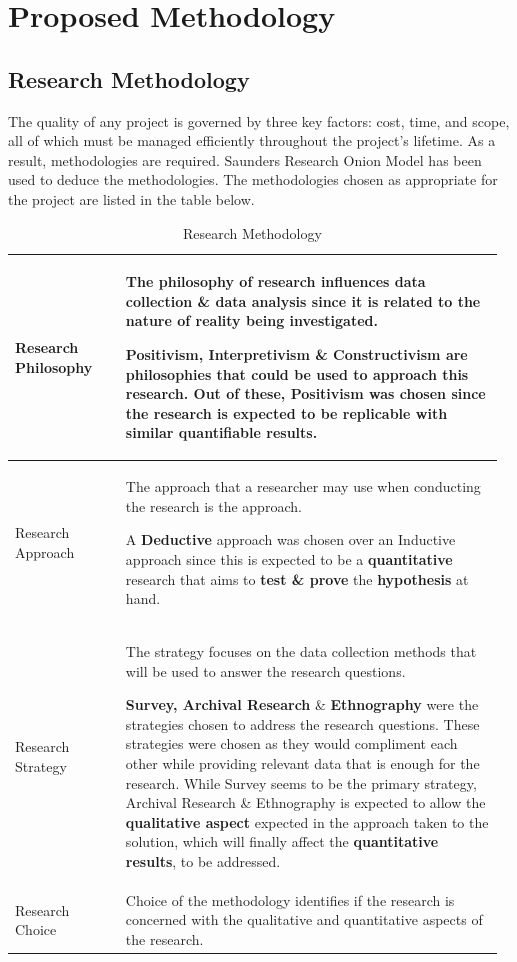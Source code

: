 \documentclass[a4paper, 12pt, oneside]{report}
\begin{document}
\chapter{Proposed Methodology}

\section{Research Methodology}
The quality of any project is governed by three key factors: cost, time, and scope, all of which must be managed efficiently throughout the project's lifetime. As a result, methodologies are required. Saunders  Research Onion Model has been used to deduce the methodologies. 
The methodologies chosen as appropriate for the project are listed in the table below.

\begin{longtable}{| p{0.22\linewidth} | p{0.75\linewidth}|}
\caption{Research Methodology}
\label{tab:research-methodology-table}\\
\hline
Research Philosophy  & The philosophy of research influences data collection \& data analysis since it is related to the nature of reality being investigated.

Positivism, Interpretivism \& Constructivism are philosophies that could be used to approach this research. Out of these, \textbf{Positivism} was chosen since the research is expected to be replicable with similar \textbf{quantifiable} results.
\\
\hline
Research Approach & The approach that a researcher may use when conducting the research is the approach.

A \textbf{Deductive} approach was chosen over an Inductive approach since this is expected to be a \textbf{quantitative} research that aims to \textbf{test \& prove} the \textbf{hypothesis} at hand. \\
\hline
Research Strategy  &The strategy focuses on the data collection methods that will be used to answer the research questions.

\textbf{Survey, Archival Research} \& \textbf{Ethnography} were the strategies chosen to address the research questions. These strategies were chosen as they would compliment each other while providing relevant data that is enough for the research. While Survey seems to be the primary strategy, Archival Research \& Ethnography is expected to allow the \textbf{qualitative aspect} expected in the approach taken to the solution, which will finally affect the \textbf{quantitative results}, to be addressed. \\
\hline
Research Choice & Choice of the methodology identifies if the research is concerned with the qualitative and quantitative aspects of the research.



\end{longtable}
\end{document}
